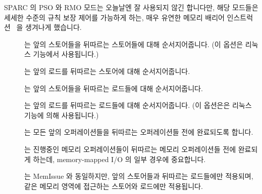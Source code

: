 SPARC 의 PSO 와 RMO 모드는 오늘날엔 잘 사용되지 않긴 합니다만, 해당 모드들은
세세한 수준의 규칙 보장 제어를 가능하게 하는, 매우 유연한 메모리 배리어
인스트럭션~\cite{SPARC94} 을 생겨나게 했습니다.

\begin{description}
\item	[] 는 앞의 스토어들을 뒤따르는 스토어들에 대해
	순서지어줍니다.
	(이 옵션은 리눅스  기능에서 사용됩니다.)
\item	[] 는 앞의 로드를 뒤따르는 스토어에 대해 순서지어줍니다.
\item	[] 는 앞의 스토어들을 뒤따르는 로드들에 대해
	순서지어줍니다.
\item	[] 는 앞의 로드를 뒤따르는 로드들에 대해 순서지어줍니다.
	(이 옵션은은 리눅스  기능에 의해 사용됩니다.)
\item	[] 는 모든 앞의 오퍼레이션들을 뒤따르는 오퍼레이션들 전에
	완료되도록 합니다.
\item	[] 는 진행중인 메모리 오퍼레이션들이 뒤따르는 메모리
	오퍼레이션들 전에 완료되게 하는데, memory-mapped I/O 의 일부 경우에
	중요합니다.
\item	[] 는 MemIssue 와 동일하지만, 앞의 스토어들과 뒤따르는
	로드들에만 적용되며, 같은 메모리 영역에 접근하는 스토어와 로드에만
	적용됩니다.

\end{description}


